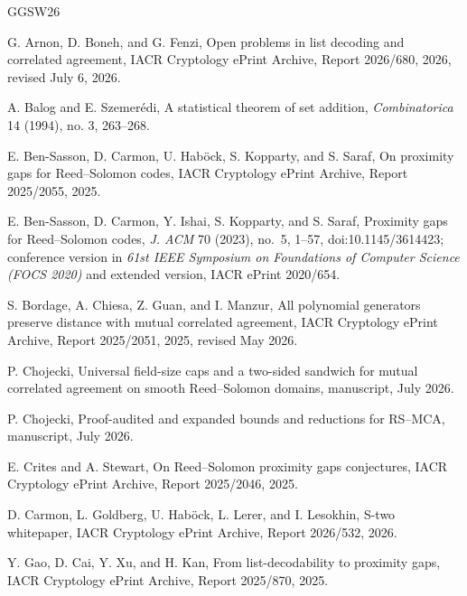 \documentclass[12pt,a4paper]{amsart}
\numberwithin{equation}{section}
\theoremstyle{remark}
\begin{document}
\begin{thebibliography}{GGSW26}

G. Arnon, D. Boneh, and G. Fenzi,
\newblock Open problems in list decoding and correlated agreement,
\newblock IACR Cryptology ePrint Archive, Report 2026/680, 2026,
revised July 6, 2026.

A. Balog and E. Szemerédi,
\newblock A statistical theorem of set addition,
\newblock \emph{Combinatorica} 14 (1994), no. 3, 263--268.

E. Ben-Sasson, D. Carmon, U. Hab\"ock, S. Kopparty, and S. Saraf,
\newblock On proximity gaps for Reed--Solomon codes,
\newblock IACR Cryptology ePrint Archive, Report 2025/2055, 2025.

E. Ben-Sasson, D. Carmon, Y. Ishai, S. Kopparty, and S. Saraf,
\newblock Proximity gaps for Reed--Solomon codes,
\newblock \emph{J. ACM} 70 (2023), no.~5, 1--57,
\newblock doi:10.1145/3614423; conference version in
\emph{61st IEEE Symposium on Foundations of Computer Science
(FOCS 2020)} and extended version, IACR ePrint 2020/654.

S. Bordage, A. Chiesa, Z. Guan, and I. Manzur,
\newblock All polynomial generators preserve distance with mutual
correlated agreement,
\newblock IACR Cryptology ePrint Archive, Report 2025/2051, 2025,
revised May 2026.

P. Chojecki,
\newblock Universal field-size caps and a two-sided sandwich for mutual
correlated agreement on smooth Reed--Solomon domains,
\newblock manuscript, July 2026.

P. Chojecki,
\newblock Proof-audited and expanded bounds and reductions for RS--MCA,
\newblock manuscript, July 2026.

E. Crites and A. Stewart,
\newblock On Reed--Solomon proximity gaps conjectures,
\newblock IACR Cryptology ePrint Archive, Report 2025/2046, 2025.

D. Carmon, L. Goldberg, U. Hab\"ock, L. Lerer, and I. Lesokhin,
\newblock S-two whitepaper,
\newblock IACR Cryptology ePrint Archive, Report 2026/532, 2026.

Y. Gao, D. Cai, Y. Xu, and H. Kan,
\newblock From list-decodability to proximity gaps,
\newblock IACR Cryptology ePrint Archive, Report 2025/870, 2025.


\end{thebibliography}
\end{document}
